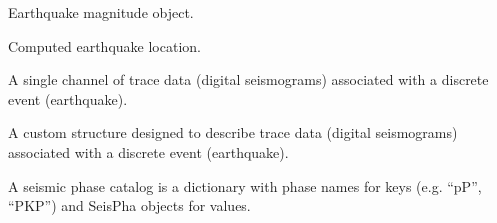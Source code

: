 \documentclass[letterpaper,11pt,english]{sphinxmanual}
\begin{document}
\begin{fulllineitems}
\label{\detokenize{src/Submodules/quake:EQMag}}
\end{fulllineitems}


Earthquake magnitude object.

\begin{fulllineitems}
\label{\detokenize{src/Submodules/quake:EQLoc}}
\end{fulllineitems}


Computed earthquake location.

\begin{fulllineitems}
\label{\detokenize{src/Submodules/quake:EventChannel}}
\end{fulllineitems}


A single channel of trace data (digital seismograms) associated with a
discrete event (earthquake).

\begin{fulllineitems}
\label{\detokenize{src/Submodules/quake:EventTraceData}}
\end{fulllineitems}


A custom structure designed to describe trace data (digital seismograms)
associated with a discrete event (earthquake).

\begin{fulllineitems}
\label{\detokenize{src/Submodules/quake:PhaseCat}}
\end{fulllineitems}


A seismic phase catalog is a dictionary with phase names for keys (e.g. “pP”, “PKP”)
and SeisPha objects for values.

\begin{fulllineitems}
\label{\detokenize{src/Submodules/quake:SeisEvent}}
\end{fulllineitems}
\end{document}
